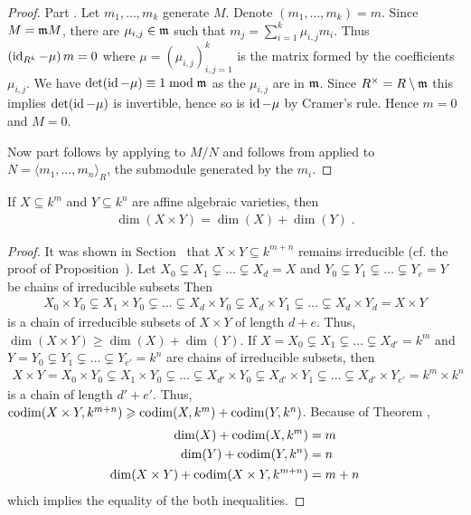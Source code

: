\documentclass[a4paper,parskip=half,numbers=enddot, DIV=12]{scrreprt}
\renewcommand{\geq}{\geqslant}
\begin{document}
	\begin{proof}
		Part . Let $m_1,\ldots, m_k$ generate $M$. Denote $(m_1,\ldots, m_k)=m$. Since $M = \mathfrak{m}  M$, there are $\mu_{i,j}\in \mathfrak{m}$ such that $m_j = \sum_{i=1}^k \mu_{i,j}m_i$. Thus $\left(\operatorname{id}_{R^k} - \mu\right)m = 0$ where $\mu=(\mu_{i,j})_{i,j=1}^k$ is the matrix formed by the coefficients $\mu_{i,j}$. We have $\operatorname{det}(\operatorname{id} -\mu) \equiv 1\bmod \mathfrak{m}$ as the $\mu_{i,j}$ are in $\mathfrak{m}$. Since $R^\times = R\setminus \mathfrak{m}$ this implies $\operatorname{det}(\operatorname{id} -\mu)$ is invertible, hence so is $\operatorname{id}-\mu$ by Cramer's rule. Hence $m=0$ and $M = 0$.
		
		Now part  follows by applying  to $M/N$ and  follows from  applied to $N = \langle m_1,\ldots, m_n\rangle_R$, the submodule generated by the $m_i$.
	\end{proof}
	\begin{prop}
		If $X\subseteq k^m$ and $Y\subseteq k^n$ are affine algebraic varieties, then 
		\begin{align*}
			\dim(X\times Y) = \dim (X) +\dim (Y)\;.
		\end{align*}
	\end{prop}
	\begin{proof}
		It was shown in Section~ that $X\times Y\subseteq k^{m+n}$ remains irreducible (cf. the proof of Proposition~). Let $X_0\subsetneq X_1\subsetneq \ldots\subsetneq X_d = X$ and $Y_0 \subsetneq Y_1\subsetneq \ldots \subsetneq Y_e = Y$ be chains of irreducible subsets Then 
		\begin{align*}
			X_0\times Y_0\subsetneq X_1\times Y_0\subsetneq \ldots\subsetneq X_d\times Y_0\subsetneq X_d\times Y_1 \subsetneq \ldots\subsetneq X_d\times Y_d = X\times Y
		\end{align*}
		is a chain of irreducible subsets of $X\times Y$ of length $d+e$. Thus, $\dim(X\times Y) \geq \dim (X)+\dim (Y)$. If $X= X_0\subsetneq X_1\subsetneq\ldots \subsetneq X_{d'} = k^m$ and $Y = Y_0\subsetneq Y_1\subsetneq \ldots\subsetneq Y_{e'}=k^n$ are chains of irreducible subsets, then 
		\begin{align*}
			X\times Y = X_0\times Y_0\subsetneq X_1\times Y_0\subsetneq \ldots\subsetneq X_{d'}\times Y_0\subsetneq X_{d'}\times Y_1 \subsetneq \ldots\subsetneq X_{d'}\times Y_{e'} = k^m \times k^n
		\end{align*}
		is a chain of length $d'+e'$. Thus, $\codim(X\times Y, k^{m+n}) \geq \codim(X, k^m) +\codim(Y, k^n)$. Because of Theorem ,
		\begin{align*}
			\dim (X) + \operatorname{codim}(X,k^m) &= m \\
			\dim (Y) +\operatorname{codim} (Y, k^n) &= n\\
			\dim (X\times Y) +\operatorname{codim}(X\times Y, k^{m+n}) &= m+n
		\end{align*}
		which implies the equality of the both inequalities.
	\end{proof}
\end{document}
